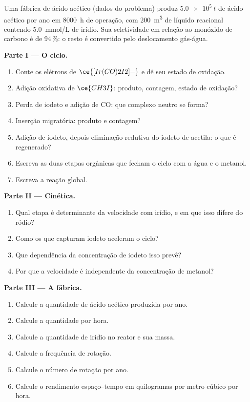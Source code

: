 \begin{problem}
\label{pb:b3:homogeneous-catalysis:1}
Uma fábrica de ácido acético (dados do problema) produz $\qty{5.0e5}{t}$ de ácido acético por ano
em \qty{8000}{h} de operação, com \qty{200}{m^3} de líquido reacional contendo \qty{5.0}{mmol/L} de
irídio. Sua seletividade em relação ao monóxido de carbono é de 94\,\%: o resto é convertido pelo
deslocamento gás-água.

\medskip\noindent\textbf{Parte I --- O ciclo.}
\begin{enumerate}
  \item Conte os elétrons de $\ce{[Ir(CO)2I2]-}$ e dê seu estado de oxidação.
  \item Adição oxidativa de $\ce{CH3I}$: produto, contagem, estado de oxidação?
  \item Perda de iodeto e adição de CO: que complexo neutro se forma?
  \item Inserção migratória: produto e contagem?
  \item Adição de iodeto, depois eliminação redutiva do iodeto de acetila: o que é
        regenerado?
  \item Escreva as duas etapas orgânicas que fecham o ciclo com a água e o metanol.
  \item Escreva a reação global.
\end{enumerate}

\medskip\noindent\textbf{Parte II --- Cinética.}
\begin{enumerate}[resume]
  \item Qual etapa é determinante da velocidade com irídio, e em que isso difere do
        ródio?
  \item Como os  que capturam iodeto aceleram o ciclo?
  \item Que dependência da concentração de iodeto isso prevê?
  \item Por que a velocidade é independente da concentração de metanol?
\end{enumerate}

\medskip\noindent\textbf{Parte III --- A fábrica.}
\begin{enumerate}[resume]
  \item Calcule a quantidade de ácido acético produzida por ano.
  \item Calcule a quantidade por hora.
  \item Calcule a quantidade de irídio no reator e sua massa.
  \item Calcule a frequência de rotação.
  \item Calcule o número de rotação por ano.
  \item Calcule o rendimento espaço--tempo em quilogramas por metro cúbico por hora.
\end{enumerate}


\end{problem}
